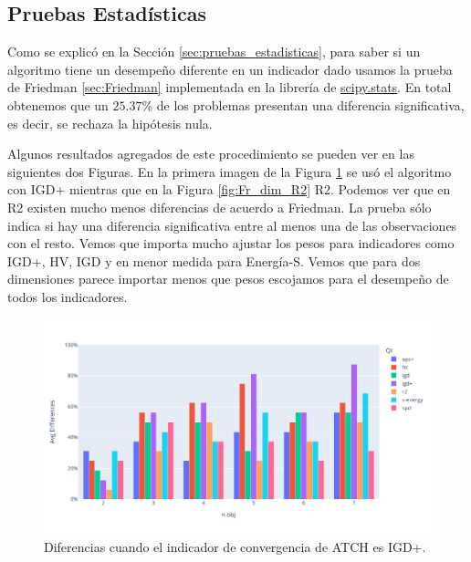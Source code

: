 \subsection{Pruebas Estadísticas}

Como se explicó en la Sección \ref{sec:pruebas_estadisticas}, para saber si un algoritmo tiene un desempeño diferente en un indicador dado usamos la prueba de Friedman \ref{sec:Friedman} implementada en la librería de \href{https://docs.scipy.org/doc/scipy/reference/stats.html}{scipy.stats}. En total obtenemos que un $25.37\%$ de los problemas presentan una diferencia significativa, es decir, se rechaza la hipótesis nula.

Algunos resultados agregados de este procedimiento se pueden ver en las siguientes dos Figuras. En la primera imagen de la Figura \ref{fig:Fr_dim_IGDp} se usó el algoritmo con IGD+ mientras que en la Figura \ref{fig:Fr_dim_R2} R2. Podemos ver que en R2 existen mucho menos diferencias de acuerdo a Friedman.   La prueba sólo indica si hay una diferencia significativa entre al menos una de las observaciones con el resto. Vemos que importa mucho ajustar los pesos para indicadores como IGD+, HV, IGD y en menor medida para Energía-S. Vemos que para dos dimensiones parece importar menos que pesos escojamos para el desempeño de todos los indicadores. 

\begin{figure}[H]
    \centering
    \includegraphics[width=\textwidth]{Figuras/Friedman_obj_indconv_IGD+.pdf}
    \caption[Friedman IGD+]{Diferencias cuando el indicador de convergencia de ATCH es IGD+.}
    \label{fig:Fr_dim_IGDp}
\end{figure}

